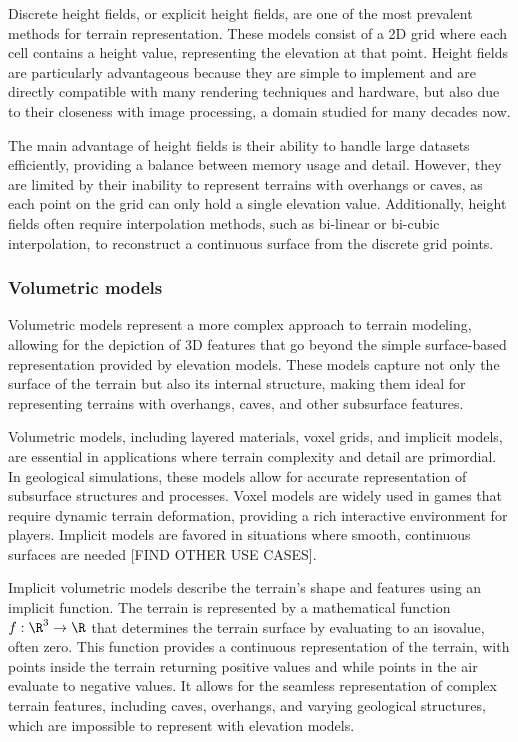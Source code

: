 Discrete height fields, or explicit height fields, are one of the most prevalent methods for terrain representation. These models consist of a 2D grid where each cell contains a height value, representing the elevation at that point. Height fields are particularly advantageous because they are simple to implement and are directly compatible with many rendering techniques and hardware, but also due to their closeness with image processing, a domain studied for many decades now.

The main advantage of height fields is their ability to handle large datasets efficiently, providing a balance between memory usage and detail. However, they are limited by their inability to represent terrains with overhangs or caves, as each point on the grid can only hold a single elevation value. Additionally, height fields often require interpolation methods, such as bi-linear or bi-cubic interpolation, to reconstruct a continuous surface from the discrete grid points. 

\subsubsection{Volumetric models}
Volumetric models represent a more complex approach to terrain modeling, allowing for the depiction of 3D features that go beyond the simple surface-based representation provided by elevation models. These models capture not only the surface of the terrain but also its internal structure, making them ideal for representing terrains with overhangs, caves, and other subsurface features. 

Volumetric models, including layered materials, voxel grids, and implicit models, are essential in applications where terrain complexity and detail are primordial. In geological simulations, these models allow for accurate representation of subsurface structures and processes. Voxel models are widely used in games that require dynamic terrain deformation, providing a rich interactive environment for players. Implicit models are favored in situations where smooth, continuous surfaces are needed [FIND OTHER USE CASES].

Implicit volumetric models describe the terrain's shape and features using an implicit function. The terrain is represented by a mathematical function $f: \R^3 \to \R$ that determines the terrain surface by evaluating to an isovalue, often zero. This function provides a continuous representation of the terrain, with points inside the terrain returning positive values and while points in the air evaluate to negative values. It allows for the seamless representation of complex terrain features, including caves, overhangs, and varying geological structures, which are impossible to represent with  elevation models.

